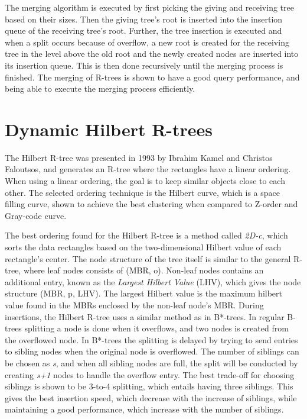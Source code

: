 \noindent
The merging algorithm is executed by first picking the giving and receiving tree based on their sizes. Then the giving tree's root is inserted into the insertion queue of the receiving tree's root. Further, the tree insertion is executed and when a split occurs because of overflow, a new root is created for the receiving tree in the level above the old root and the newly created nodes are inserted into its insertion queue. This is then done recursively until the merging process is finished. The merging of R-trees is shown to have a good query performance, and being able to execute the merging process efficiently\cite{MergingRtree}.

\section{Dynamic Hilbert R-trees}
The Hilbert R-tree was presented in 1993 by Ibrahim Kamel and Christos Faloutsos\cite{HilbertRTree}, and generates an R-tree where the rectangles have a linear ordering. When using a linear ordering, the goal is to keep similar objects close to each other. The selected ordering technique is the Hilbert curve, which is a space filling curve, shown to achieve the best clustering when compared to Z-order and Gray-code curve\cite{AnalysisHilbert}.\newline

\noindent
The best ordering found for the Hilbert R-tree is a method called \emph{2D-c}, which sorts the data rectangles based on the two-dimensional Hilbert value of each rectangle's center. The node structure of the tree itself is similar to the general R-tree, where leaf nodes consists of (MBR, o). Non-leaf nodes contains an additional entry, known as the \emph{Largest Hilbert Value} (LHV), which gives the node structure (MBR, p, LHV). The largest Hilbert value is the maximum hilbert value found in the MBRs enclosed by the non-leaf node's MBR. During insertions, the Hilbert R-tree uses a similar method as in B*-trees. In regular B-trees splitting a node is done when it overflows, and two nodes is created from the overflowed node. In B*-trees the splitting is delayed by trying to send entries to sibling nodes when the original node is overflowed. The number of siblings can be chosen as \emph{s}, and when all sibling nodes are full, the split will be conducted by creating \emph{s+1} nodes to handle the overflow entry. The best trade-off for choosing siblings is shown to be 3-to-4 splitting, which entails having three siblings. This gives the best insertion speed, which decrease with the increase of siblings, while maintaining a good performance, which increase with the number of siblings.\newline 


